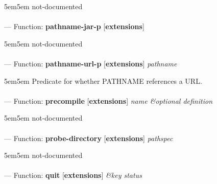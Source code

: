 \begin{adjustwidth}{5em}{5em}
not-documented
\end{adjustwidth}

\paragraph{}
\label{EXTENSIONS:PATHNAME-JAR-P}
--- Function: \textbf{pathname-jar-p} [\textbf{extensions}] \textit{}

\begin{adjustwidth}{5em}{5em}
not-documented
\end{adjustwidth}

\paragraph{}
\label{EXTENSIONS:PATHNAME-URL-P}
--- Function: \textbf{pathname-url-p} [\textbf{extensions}] \textit{pathname}

\begin{adjustwidth}{5em}{5em}
Predicate for whether PATHNAME references a URL.
\end{adjustwidth}

\paragraph{}
\label{EXTENSIONS:PRECOMPILE}
--- Function: \textbf{precompile} [\textbf{extensions}] \textit{name \&optional definition}

\begin{adjustwidth}{5em}{5em}
not-documented
\end{adjustwidth}

\paragraph{}
\label{EXTENSIONS:PROBE-DIRECTORY}
--- Function: \textbf{probe-directory} [\textbf{extensions}] \textit{pathspec}

\begin{adjustwidth}{5em}{5em}
not-documented
\end{adjustwidth}

\paragraph{}
\label{EXTENSIONS:QUIT}
--- Function: \textbf{quit} [\textbf{extensions}] \textit{\&key status}

